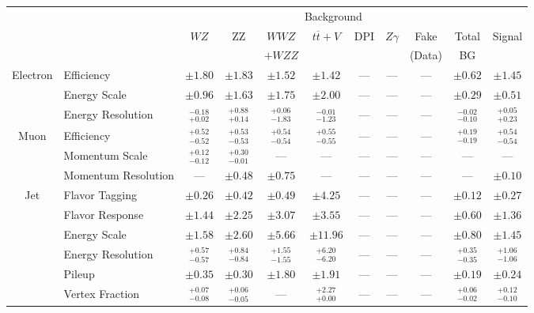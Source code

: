 \small\renewcommand{\tabcolsep}{1pt}
\begin{tabular}{|cl||ccccccc|c||c|}
\hline
 & & \multicolumn{8}{c||}{Background} & \\ 
 & & $WZ$ & ZZ & $WWZ$ & $t\overline{t}+V$ & DPI & $Z\gamma$ & Fake & Total & Signal\\ 
 & & &  & $+WZZ$ &  &  &  & (Data) & BG & \\ 
\hline\hline
\multirow{3}{*}{Electron}
& Efficiency  & $\pm 1.80$  & $\pm 1.83$  & $\pm 1.52$  & $\pm 1.42$  & ---  & ---  & ---  & $\pm 0.62$  & $\pm 1.45$ \\ 
\cline{2-11}
& Energy Scale  & $\pm 0.96$  & $\pm 1.63$  & $\pm 1.75$  & $\pm 2.00$  & ---  & ---  & ---  & $\pm 0.29$  & $\pm 0.51$ \\ 
\cline{2-11}
&Energy Resolution &  $^{-0.18}_{+0.02}$  &  $^{+0.88}_{+0.14}$  &  $^{+0.06}_{-1.83}$  &  $^{-0.01}_{-1.23}$  & --- & --- & --- &  $^{-0.02}_{-0.10}$  &  $^{+0.05}_{+0.23}$ \\ 
\hline
\multirow{3}{*}{Muon}
&Efficiency &  $^{+0.52}_{-0.52}$  &  $^{+0.53}_{-0.53}$  &  $^{+0.54}_{-0.54}$  &  $^{+0.55}_{-0.55}$  & --- & --- & --- &  $^{+0.19}_{-0.19}$  &  $^{+0.54}_{-0.54}$ \\ 
\cline{2-11}
&Momentum Scale &  $^{+0.12}_{-0.12}$  &  $^{+0.30}_{-0.01}$  & --- & --- & --- & --- & --- & --- & ---\\ 
\cline{2-11}
& Momentum Resolution  & ---  & $\pm 0.48$  & $\pm 0.75$  & ---  & ---  & ---  & ---  & ---  & $\pm 0.10$ \\ 
\hline
\multirow{6}{*}{Jet}
& Flavor Tagging  & $\pm 0.26$  & $\pm 0.42$  & $\pm 0.49$  & $\pm 4.25$  & ---  & ---  & ---  & $\pm 0.12$  & $\pm 0.27$ \\ 
\cline{2-11}
& Flavor Response  & $\pm 1.44$  & $\pm 2.25$  & $\pm 3.07$  & $\pm 3.55$  & ---  & ---  & ---  & $\pm 0.60$  & $\pm 1.36$ \\ 
\cline{2-11}
& Energy Scale  & $\pm 1.58$  & $\pm 2.60$  & $\pm 5.66$  & $\pm 11.96$  & ---  & ---  & ---  & $\pm 0.80$  & $\pm 1.45$ \\ 
\cline{2-11}
&Energy Resolution &  $^{+0.57}_{-0.57}$  &  $^{+0.84}_{-0.84}$  &  $^{+1.55}_{-1.55}$  &  $^{+6.20}_{-6.20}$  & --- & --- & --- &  $^{+0.35}_{-0.35}$  &  $^{+1.06}_{-1.06}$ \\ 
\cline{2-11}
& Pileup  & $\pm 0.35$  & $\pm 0.30$  & $\pm 1.80$  & $\pm 1.91$  & ---  & ---  & ---  & $\pm 0.19$  & $\pm 0.24$ \\ 
\cline{2-11}
&Vertex Fraction &  $^{+0.07}_{-0.08}$  &  $^{+0.06}_{-0.05}$  & --- &  $^{+2.27}_{+0.00}$  & --- & --- & --- &  $^{+0.06}_{-0.02}$  &  $^{+0.12}_{-0.10}$ \\ 

\end{tabular}
